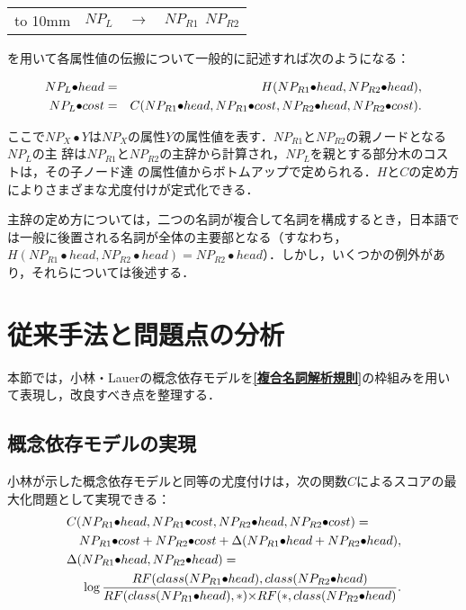 \begin{tabular}{clll}
\hbox to 10mm {\hfil} & \it $NP_L$ & $\rightarrow$ & \it $NP_{R1}\ \ NP_{R2}$
\end{tabular}

\noindent
を用いて各属性値の伝搬について一般的に記述すれば次のようになる：

\vspace*{-8mm}
\begin{eqnarray*}
NP_{L}{\bullet}head &=& H(NP_{R1}{\bullet}head, NP_{R2}{\bullet}head),\\
\vspace*{-3mm}
NP_{L}{\bullet}cost &=& C(NP_{R1}{\bullet}head, NP_{R1}{\bullet}cost, NP_{R2}{\bullet}head, NP_{R2}{\bullet}cost).
\end{eqnarray*}

\vspace*{-2mm}
\noindent
ここで$NP_{X}{\bullet}Y$は$NP_X$の属性$Y$の属性値を表す．$NP_{R1}$と$NP_{R2}$の親ノードとなる$NP_L$の主\break
辞は$NP_{R1}$と$NP_{R2}$の主辞から計算され，$NP_L$を親とする部分木のコストは，その子ノード達\break
の属性値からボトムアップで定められる．$H$と$C$の定め方によりさまざまな尤度付けが定式化できる．

主辞の定め方については，二つの名詞が複合して名詞を構成するとき，日本語では一般に後置される名詞が全体の主要部となる（すなわち，$H(NP_{R1}{\bullet}head, NP_{R2}{\bullet}head) = NP_{R2}{\bullet}head$）．しかし，いくつかの例外があり，それらについては後述する．


\section{従来手法と問題点の分析}\label{従来手法と問題点の分析}
本節では，小林・Lauerの概念依存モデルを{\bf \ref{複合名詞解析規則}}の枠組みを用いて表現し，改良すべき点を整理する．

\subsection{概念依存モデルの実現}\label{概念依存モデルの実現}
小林が示した概念依存モデルと同等の尤度付けは，次の関数$C$によるスコアの最大化問題として実現できる：
\vspace{-0.3cm}
\begin{eqnarray*}
 \lefteqn{C(NP_{R1}{\bullet}head, NP_{R1}{\bullet}cost, NP_{R2}{\bullet}head, NP_{R2}{\bullet}cost) = }\\
 & & NP_{R1}{\bullet}cost + NP_{R2}{\bullet}cost + {\Delta}(NP_{R1}{\bullet}head + NP_{R2}{\bullet}head),\\
 \lefteqn{{\Delta}(NP_{R1}{\bullet}head, NP_{R2}{\bullet}head) = }\\
 & & \log \frac{RF(class(NP_{R1}{\bullet}head), class(NP_{R2}{\bullet}head)}{RF(class(NP_{R1}{\bullet}head), \ast){\times}RF(\ast, class(NP_{R2}{\bullet}head)}.\\
\end{eqnarray*}

